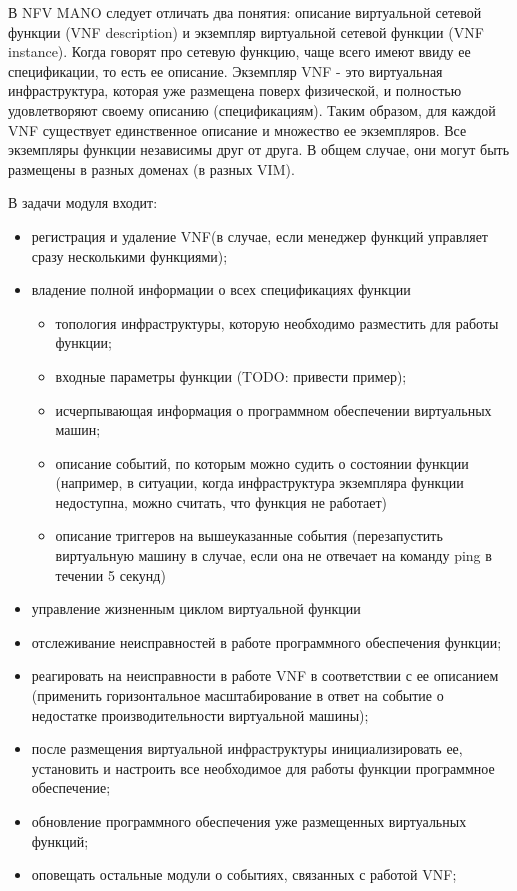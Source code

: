\documentclass[oneside,final,14pt,a4paper]{extreport}
\begin{document}
В NFV MANO следует отличать два понятия: описание виртуальной сетевой функции (VNF description) и экземпляр виртуальной сетевой функции (VNF instance). Когда говорят про сетевую функцию, чаще всего имеют ввиду ее спецификации, то есть ее описание. Экземпляр VNF - это виртуальная инфраструктура, которая уже размещена поверх физической, и полностью удовлетворяют своему описанию (спецификациям). Таким образом, для каждой VNF существует единственное описание и множество ее экземпляров. Все экземпляры функции независимы друг от друга. В общем случае, они могут быть размещены в разных доменах (в разных VIM).

В задачи модуля входит:

\begin{itemize}
	\item регистрация и удаление VNF(в случае, если менеджер функций управляет сразу несколькими функциями);
	\item владение полной информации о всех спецификациях функции
	\begin{itemize}
		\item топология инфраструктуры, которую необходимо разместить для работы функции;
		\item входные параметры функции (TODO: привести пример);
		\item исчерпывающая информация о программном обеспечении виртуальных машин;
		\item описание событий, по которым можно судить о состоянии функции (например, в ситуации, когда инфраструктура экземпляра функции недоступна, можно считать, что функция не работает)
		\item описание триггеров на вышеуказанные события (перезапустить виртуальную машину в случае, если она не отвечает на команду ping в течении 5 секунд)
	\end{itemize}
	\item управление жизненным циклом виртуальной функции
	\item отслеживание неисправностей в работе программного обеспечения функции;
	\item реагировать на неисправности в работе VNF в соответствии с ее описанием (применить горизонтальное масштабирование в ответ на событие о недостатке производительности виртуальной машины);
	\item после размещения виртуальной инфраструктуры инициализировать ее, установить и настроить все необходимое для работы функции программное обеспечение;
	\item обновление программного обеспечения уже размещенных виртуальных функций;
	\item оповещать остальные модули о событиях, связанных с работой VNF;
\end{itemize}
\end{document}
